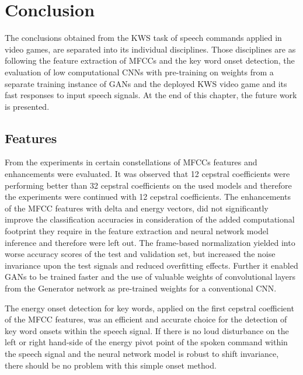 
\chapter{Conclusion}\label{sec:conclusion}
The conclusions obtained from the KWS task of speech commands applied in video games, are separated into its individual disciplines.
Those disciplines are as following the feature extraction of MFCCs and the key word onset detection, the evaluation of low computational CNNs with pre-training on weights from a separate training instance of GANs and the deployed KWS video game and its fast responses to input speech signals.
At the end of this chapter, the future work is presented.



\section{Features}
\thesisStateReady
From the experiments in  certain constellations of MFCCs features and enhancements were evaluated.
It was observed that 12 cepstral coefficients were performing better than 32 cepstral coefficients on the used models and therefore the experiments were continued with 12 cepstral coefficients.
The enhancements of the MFCC features with delta and energy vectors, did not significantly improve the classification accuracies in consideration of the added computational footprint they require in the feature extraction and neural network model inference and therefore were left out.
The frame-based normalization yielded into worse accuracy scores of the test and validation set, but increased the noise invariance upon the test signals and reduced overfitting effects.
Further it enabled GANs to be trained faster and the use of valuable weights of convolutional layers from the Generator network as pre-trained weights for a conventional CNN.

The energy onset detection for key words, applied on the first cepstral coefficient of the MFCC features, was an efficient and accurate choice for the detection of key word onsets within the speech signal.
If there is no loud disturbance on the left or right hand-side of the energy pivot point of the spoken command within the speech signal and the neural network model is robust to shift invariance, there should be no problem with this simple onset method.



